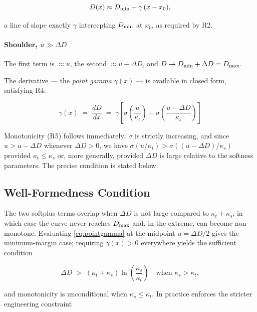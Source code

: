 \begin{equation}
D(x) \approx D_{\min} + \gamma\,(x - x_0),
\end{equation}

a line of slope exactly $\gamma$ intercepting $D_{\min}$ at $x_0$, as required by
R2.

\paragraph{Shoulder, $u \gg \Delta D$} The first term is $\approx u$, the
second $\approx u - \Delta D$, and $D \to D_{\min} + \Delta D = D_{\max}$.

\medskip
The derivative --- the \emph{point gamma} $\gamma(x)$ --- is available in closed
form, satisfying R4:

\begin{equation}
\boxed{\;\gamma(x) \;=\; \frac{dD}{dx} \;=\; \gamma\left[\sigma\!\left(\frac{u}{\kappa_t}\right) - \sigma\!\left(\frac{u - \Delta D}{\kappa_s}\right)\right]\;}
\label{eq:pointgamma}
\end{equation}

Monotonicity (R5) follows immediately: $\sigma$ is strictly increasing, and
since $u > u - \Delta D$ whenever $\Delta D > 0$, we have $\sigma(u/\kappa_t) >
\sigma((u-\Delta D)/\kappa_s)$ provided $\kappa_t \le \kappa_s$ or, more
generally, provided $\Delta D$ is large relative to the softness parameters.
The precise condition is stated below.

\subsection{Well-Formedness Condition}

The two softplus terms overlap when $\Delta D$ is not large compared to
$\kappa_t + \kappa_s$, in which case the curve never reaches $D_{\max}$ and, in the
extreme, can become non-monotone. Evaluating \eqref{eq:pointgamma} at the
midpoint $u = \Delta D/2$ gives the minimum-margin case; requiring
$\gamma(x) > 0$ everywhere yields the sufficient condition

\begin{equation}
\Delta D \;>\; \left(\kappa_t + \kappa_s\right)\ln\!\left(\frac{\kappa_s}{\kappa_t}\right)
\quad\text{when } \kappa_s > \kappa_t,
\label{eq:wellformed1}
\end{equation}

and monotonicity is unconditional when $\kappa_s \le \kappa_t$. In practice
\EM{} enforces the stricter engineering constraint

